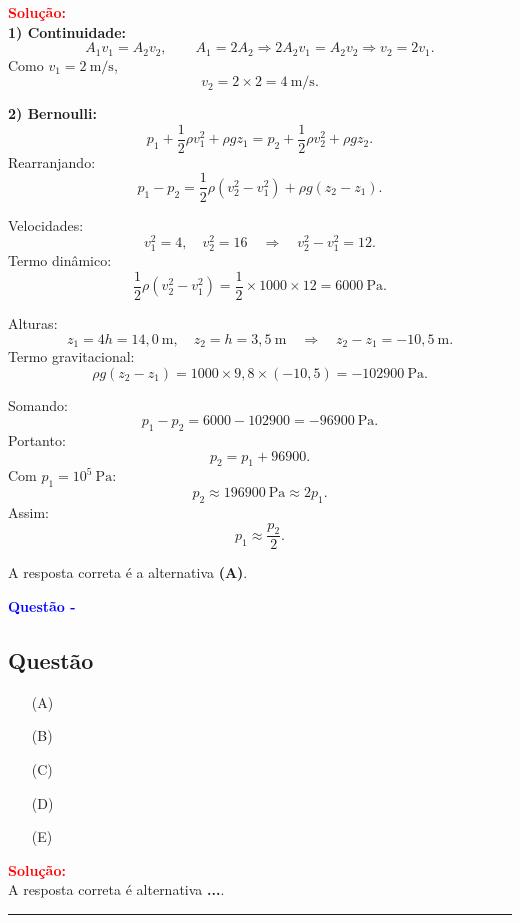 \begin{flushleft}
\vspace{0.5cm}

\textcolor{red}{\textbf{Solução:}}\\

\textbf{1) Continuidade:}
\[
A_1 v_1 = A_2 v_2,\qquad A_1 = 2A_2 \Rightarrow 2A_2 v_1 = A_2 v_2 \Rightarrow v_2 = 2v_1.
\]
Como \(v_1 = 2\ \mathrm{m/s}\),
\[
v_2 = 2\times 2 = 4\ \mathrm{m/s}.
\]

\textbf{2) Bernoulli:}
\[
p_1 + \frac{1}{2}\rho v_1^2 + \rho g z_1
= p_2 + \frac{1}{2}\rho v_2^2 + \rho g z_2.
\]
Rearranjando:
\[
p_1 - p_2 = \frac{1}{2}\rho\left(v_2^2 - v_1^2\right) + \rho g (z_2 - z_1).
\]

Velocidades:
\[
v_1^2 = 4,\quad v_2^2 = 16 \quad\Rightarrow\quad v_2^2 - v_1^2 = 12.
\]
Termo dinâmico:
\[
\frac{1}{2}\rho (v_2^2 - v_1^2) = \frac{1}{2}\times 1000 \times 12 = 6000\ \mathrm{Pa}.
\]

Alturas:
\[
z_1 = 4h = 14{,}0\ \mathrm{m},\quad z_2 = h = 3{,}5\ \mathrm{m} \quad\Rightarrow\quad z_2 - z_1 = -10{,}5\ \mathrm{m}.
\]
Termo gravitacional:
\[
\rho g (z_2 - z_1) = 1000 \times 9{,}8 \times (-10{,}5) = -102900\ \mathrm{Pa}.
\]

Somando:
\[
p_1 - p_2 = 6000 - 102900 = -96900\ \mathrm{Pa}.
\]
Portanto:
\[
p_2 = p_1 + 96900.
\]
Com \(p_1=10^5\ \mathrm{Pa}\):
\[
p_2 \approx 196900\ \mathrm{Pa} \approx 2p_1.
\]
Assim:
\[
p_1 \approx \frac{p_2}{2}.
\]

A resposta correta é a alternativa \colorbox{green!50}{\textbf{(A)}}.

\end{flushleft}


\begin{flushleft}
\textbf{\textcolor{blue}{\Large Quest\~ao - }}\\
\noindent

\subsection{Quest\~ao }

\begin{itemize}
\item[(A)] 
\item[(B)] 
\item[(C)]
\item[(D)] 
\item[(E)] 
\end{itemize}

\vspace{0.5cm}

\textcolor{red}{\textbf{Solução:}}\\


A resposta correta é alternativa \colorbox{green!50}{\textbf{...}}.

\end{flushleft}

\noindent\rule{\linewidth}{0.6pt}\\
